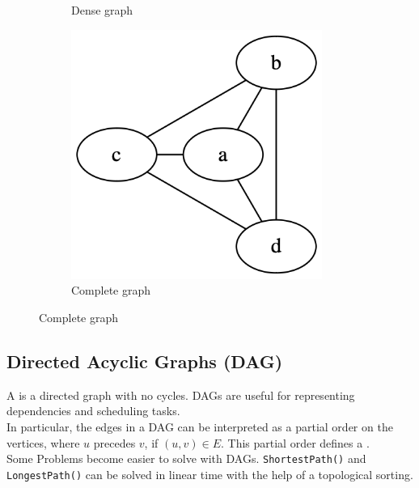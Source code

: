 \documentclass[a3paper, landscape, 11pt]{article} %
\begin{document}
\begin{multicols*}{4}
{\begin{figure}[H]
\begin{subfigure}[b]{0.3\columnwidth}
    \caption{Dense graph}
    \label{fig:image2}
  \end{subfigure}
	\hfill
  \begin{subfigure}[b]{0.315\columnwidth}
    \centering
    \includegraphics[width=0.9\textwidth]{images/complete.png}
    \caption{Complete graph}
    \label{fig:image3}
  \end{subfigure}
\end{figure}
}


\subsection*{Directed Acyclic Graphs (DAG)}
A  is a directed graph with no cycles. DAGs are useful for representing dependencies and scheduling tasks. \\

In particular, the edges in a DAG can be interpreted as a partial order on the vertices, where $u$ precedes $v$, if $(u,v) \in E$. This partial order defines a .\\

Some Problems become easier to solve with DAGs. \texttt{ShortestPath()} and \texttt{LongestPath()} can be solved in linear time with the help of a topological sorting.

\hfill %


\end{multicols*}
\end{document}
